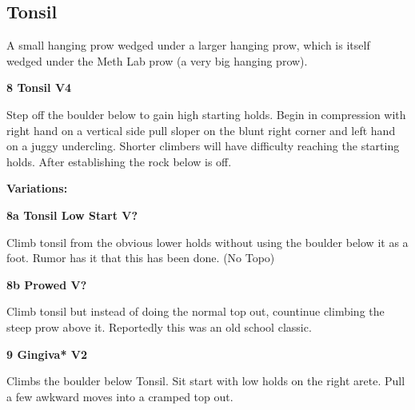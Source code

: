 \begin{multicols}{2}
\needspace{1.5cm}
\subsection*{Tonsil}\label{bf:Tonsil}
A small hanging prow wedged under a larger hanging prow, which is itself wedged under the Meth Lab prow (a very big hanging prow).\\
	


\needspace{1.5cm}
\label{rt:Tonsil}
\colorbox{RoyalBlue!20}{
\parbox{0.95\linewidth}{
\textbf{
8 Tonsil V4  
}}}

\begin{adjustwidth}{0.5cm}{}			
Step off the boulder below to gain high starting holds. Begin in compression with right hand on a vertical side pull sloper on the blunt right corner and left hand on a juggy undercling.  Shorter climbers will have difficulty reaching the starting holds. After establishing the rock below is off.
\end{adjustwidth}

\begin{adjustwidth}{0.5cm}{}				
\needspace{3cm}
\textbf{Variations:} \newline

\needspace{1.5cm}
\label{vr:Tonsil Low Start}
\colorbox{black!20}{
\parbox{0.95\linewidth}{
\textbf{
8a Tonsil Low Start V?  
}}}

\begin{adjustwidth}{0.5cm}{}			
Climb tonsil from the obvious lower holds without using the boulder below it as a foot. Rumor has it that this has been done. (No Topo)
\end{adjustwidth}



\needspace{1.5cm}
\label{vr:Prowed}
\colorbox{black!20}{
\parbox{0.95\linewidth}{
\textbf{
8b Prowed V?  \warn\warn
}}}

\begin{adjustwidth}{0.5cm}{}			
Climb tonsil but instead of doing the normal top out, countinue climbing the steep prow above it. Reportedly this was an old school classic.
\end{adjustwidth}


\end{adjustwidth}


\needspace{1.5cm}
\label{rt:Gingiva}
\colorbox{green!20}{
\parbox{0.95\linewidth}{
\textbf{
9 Gingiva* V2  
}}}

\begin{adjustwidth}{0.5cm}{}			
Climbs the boulder below Tonsil. Sit start with low holds on the right arete. Pull a few awkward moves into a cramped top out.
\end{adjustwidth}





\end{multicols}
